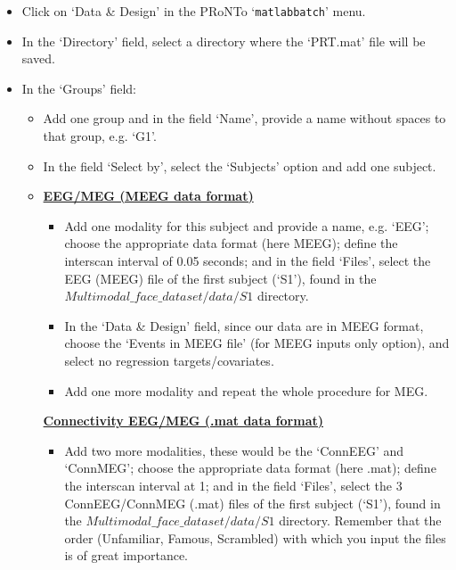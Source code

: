\begin{itemize}

	\item Click on `Data \& Design' in the PRoNTo `{\tt matlabbatch}' menu.

	\item In the `Directory' field, select a directory where the `PRT.mat' file will be saved.
	
	\item In the `Groups' field:
 	
		\begin{itemize}
		
		\item Add one group and in the field `Name', provide a name without spaces to that group, e.g. `G1'. 
		
		\item In the field `Select by', select the `Subjects' option and add one subject.
		\end{itemize}
		
		\begin{itemize}
		    \item []
		\textbf{\underline{EEG/MEG (MEEG data format)}}
		\begin{itemize}
        
		\item Add one modality for this subject and provide a name, e.g. `EEG'; choose the appropriate data format (here MEEG); define the interscan interval of 0.05 seconds; and in the field `Files', select the EEG (MEEG) file of the first subject (`S1'), found in the $Multimodal\_face\_dataset/data/S1$ directory.
		
		\item In the `Data \& Design' field, since our data are in MEEG format, choose the `Events in MEEG file' (for MEEG inputs only option), and select no regression targets/covariates.
		
		\item Add one more modality and repeat the whole procedure for MEG.
		\end{itemize}
		
		\textbf{\underline{Connectivity EEG/MEG (.mat data format)}}
		\begin{itemize}

		\item Add two more modalities, these would be the `ConnEEG' and `ConnMEG'; choose the appropriate data format (here .mat); define the interscan interval at 1; and in the field `Files', select the 3 ConnEEG/ConnMEG (.mat) files of the first subject (`S1'), found in the $Multimodal\_face\_dataset/data/S1$ directory. Remember that the order (Unfamiliar, Famous, Scrambled) with which you input the files is of great importance.
		

\end{itemize}
\end{itemize}
\end{itemize}
